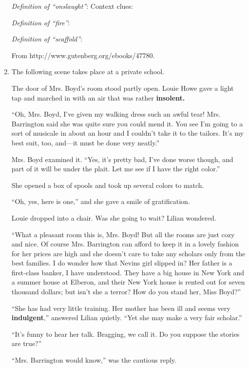 \begin{enumerate}
\textit{Definition of ``onslaught''}: \hrulefill
Context clues: \hrulefill

\textit{Definition of ``fire''}: \hrulefill

\hrulefill

\textit{Definition of ``scaffold''}: \hrulefill

\hrulefill

From http://www.gutenberg.org/ebooks/47780. 

\item The following scene takes place at a private school.

The door of Mrs. Boyd’s room stood partly open. Louie Howe gave a light tap and marched in with an air that was rather \textbf{insolent.}

``Oh, Mrs. Boyd, I’ve given my walking dress such an awful tear! Mrs. Barrington said she was quite sure you could mend it. You see I’m going to a sort of musicale in about an hour and I couldn’t take it to the tailors. It’s my best suit, too, and—it must be done very neatly.''

Mrs. Boyd examined it. ``Yes, it’s pretty bad, I’ve done worse though, and part of it will be under the plait. Let me see if I have the right color.''

She opened a box of spools and took up several colors to match.

``Oh, yes, here is one,'' and she gave a smile of gratification.

Louie dropped into a chair. Was she going to wait? Lilian wondered.

``What a pleasant room this is, Mrs. Boyd! But all the rooms are just cozy and nice. Of course Mrs. Barrington can afford to keep it in a lovely fashion for her prices are high and she doesn’t care to take any scholars only from the best families. I do wonder how that Nevins girl slipped in? Her father is a first-class banker, I have understood. They have a big house in New York and a summer house at Elberon, and their New York house is rented out for seven thousand dollars; but isn’t she a terror? How do you stand her, Miss Boyd?''

``She has had very little training. Her mother has been ill and seems very \textbf{indulgent},'' answered Lilian quietly. ``Yet she may make a very fair scholar.''

``It’s funny to hear her talk. Bragging, we call it. Do you suppose the stories are true?''

``Mrs. Barrington would know,'' was the cautious reply.


\end{enumerate}
